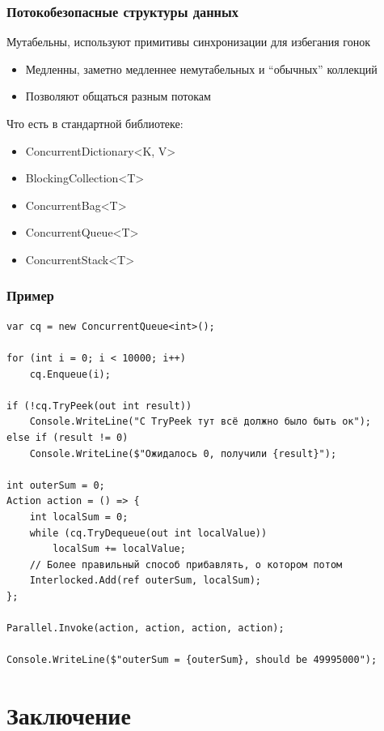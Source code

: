 \documentclass[xetex,mathserif,serif]{beamer}
\begin{document}
	\begin{frame}
		\frametitle{Потокобезопасные структуры данных}
		Мутабельны, используют примитивы синхронизации для избегания гонок
		\begin{itemize}
			\item Медленны, заметно медленнее немутабельных и ``обычных'' коллекций
			\item Позволяют общаться разным потокам
		\end{itemize}
		Что есть в стандартной библиотеке:
		\begin{itemize}
			\item ConcurrentDictionary<K, V>
			\item BlockingCollection<T>
			\item ConcurrentBag<T>
			\item ConcurrentQueue<T>
			\item ConcurrentStack<T>
		\end{itemize}
	\end{frame}

	\begin{frame}[fragile]
		\frametitle{Пример}
		\begin{scriptsize}
			\begin{verbatim}
var cq = new ConcurrentQueue<int>();

for (int i = 0; i < 10000; i++) 
    cq.Enqueue(i);

if (!cq.TryPeek(out int result))
    Console.WriteLine("С TryPeek тут всё должно было быть ок");
else if (result != 0)
    Console.WriteLine($"Ожидалось 0, получили {result}");

int outerSum = 0;
Action action = () => {
    int localSum = 0;
    while (cq.TryDequeue(out int localValue)) 
        localSum += localValue;
    // Более правильный способ прибавлять, о котором потом
    Interlocked.Add(ref outerSum, localSum);
};

Parallel.Invoke(action, action, action, action);

Console.WriteLine($"outerSum = {outerSum}, should be 49995000");
			\end{verbatim}
		\end{scriptsize}
	\end{frame}

	\section{Заключение}
\end{document}
